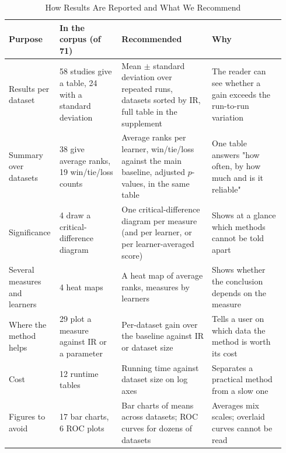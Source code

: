 \begin{table}[t]
  \caption{How Results Are Reported and What We Recommend}
  \label{tab:empirical-reporting}
  \footnotesize
  \setlength{\tabcolsep}{4pt}
  \begin{tabular}{@{}p{0.14\linewidth}p{0.22\linewidth}p{0.32\linewidth}p{0.26\linewidth}@{}}
    \toprule
    Purpose & In the corpus (of 71) & Recommended & Why\\
    \midrule
    Results per dataset & 58 studies give a table, 24 with a standard deviation & Mean $\pm$ standard deviation over repeated runs, datasets sorted by IR, full table in the supplement & The reader can see whether a gain exceeds the run-to-run variation\\
    Summary over datasets & 38 give average ranks, 19 win/tie/loss counts & Average ranks per learner, win/tie/loss against the main baseline, adjusted $p$-values, in the same table & One table answers "how often, by how much and is it reliable"\\
    Significance & 4 draw a critical-difference diagram & One critical-difference diagram per measure (and per learner, or per learner-averaged score) & Shows at a glance which methods cannot be told apart\\
    Several measures and learners & 4 heat maps & A heat map of average ranks, measures by learners & Shows whether the conclusion depends on the measure\\
    Where the method helps & 29 plot a measure against IR or a parameter & Per-dataset gain over the baseline against IR or dataset size & Tells a user on which data the method is worth its cost\\
    Cost & 12 runtime tables & Running time against dataset size on log axes & Separates a practical method from a slow one\\
    Figures to avoid & 17 bar charts, 6 ROC plots & Bar charts of means across datasets; ROC curves for dozens of datasets & Averages mix scales; overlaid curves cannot be read\\
    \bottomrule
  \end{tabular}
\end{table}
